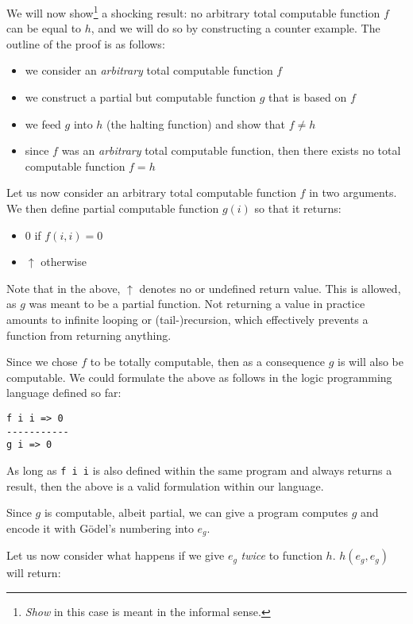 We will now show\footnote{\textit{Show} in this case is meant in the informal sense.} a shocking result: no arbitrary total computable function $f$ can be equal to $h$, and we will do so by constructing a counter example. The outline of the proof is as follows:
\begin{itemize}
\item we consider an \textit{arbitrary} total computable function $f$
\item we construct a partial but computable function $g$ that is based on $f$
\item we feed $g$ into $h$ (the halting function) and show that $f \neq h$
\item since $f$ was an \textit{arbitrary} total computable function, then there exists no total computable function $f = h$
\end{itemize}

Let us now consider an arbitrary total computable function $f$ in two arguments. We then define partial computable function $g(i)$ so that it returns:
\begin{itemize}
\item $0$ if $f(i,i)=0$
\item $\uparrow$ otherwise
\end{itemize}

Note that in the above, $\uparrow$ denotes no or undefined return value. This is allowed, as $g$ was meant to be a partial function. Not returning a value in practice amounts to infinite looping or (tail-)recursion, which effectively prevents a function from returning anything.

Since we chose $f$ to be totally computable, then as a consequence $g$ is will also be computable. We could formulate the above as follows in the logic programming language defined so far:

\begin{lstlisting}
f i i => 0
-----------
g i => 0
\end{lstlisting}

As long as \texttt{f i i} is also defined within the same program and always returns a result, then the above is a valid formulation within our language.

Since $g$ is computable, albeit partial, we can give a program computes $g$ and encode it with Gödel's numbering into $e_g$.

Let us now consider what happens if we give $e_g$ \textit{twice} to function $h$. $h(e_g,e_g)$ will return:

